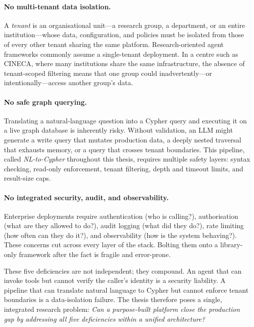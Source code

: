 \documentclass[a4paper,noexaminfo]{sapthesis}
\begin{document}
\paragraph{No multi-tenant data isolation.}
A \emph{tenant} is an organisational unit---a research group, a department, or
an entire institution---whose data, configuration, and policies must be
isolated from those of every other tenant sharing the same platform.
Research-oriented agent frameworks commonly assume a single-tenant
deployment.  In a centre such as CINECA, where many institutions share the
same infrastructure, the absence of tenant-scoped filtering means that one
group could inadvertently---or intentionally---access another group's data.

\paragraph{No safe graph querying.}
Translating a natural-language question into a Cypher query and executing it
on a live graph database is inherently risky.  Without validation, an LLM
might generate a write query that mutates production data, a deeply nested
traversal that exhausts memory, or a query that crosses tenant boundaries.
This pipeline, called \emph{NL-to-Cypher} throughout this thesis, requires
multiple safety layers: syntax checking, read-only enforcement, tenant
filtering, depth and timeout limits, and result-size caps.

\paragraph{No integrated security, audit, and observability.}
Enterprise deployments require authentication (who is calling?),
authorisation (what are they allowed to do?), audit logging (what did they
do?), rate limiting (how often can they do it?), and observability (how is
the system behaving?).  These concerns cut across every layer of the stack.
Bolting them onto a library-only framework after the fact is fragile and
error-prone.

These five deficiencies are not independent; they compound.  An agent that
can invoke tools but cannot verify the caller's identity is a security
liability.  A pipeline that can translate natural language to Cypher but
cannot enforce tenant boundaries is a data-isolation failure.  The
thesis therefore poses a single, integrated research problem:
\emph{Can a purpose-built platform close the production gap by addressing
all five deficiencies within a unified architecture?}
\end{document}
